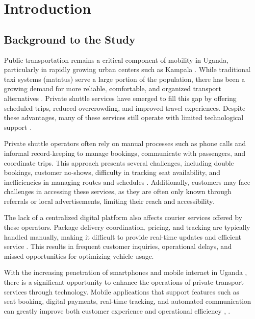 \chapter{Introduction}
\label{chap:introduction}

\section{Background to the Study}
Public transportation remains a critical component of mobility in Uganda,
particularly in rapidly growing urban centers such as Kampala
\cite{mak2026kampala}. While traditional taxi systems (matatus) serve a large
portion of the population, there has been a growing demand for more reliable,
comfortable, and organized transport alternatives \cite{rugamba2020lowcarbon}.
Private shuttle services have emerged to fill this gap by offering scheduled
trips, reduced overcrowding, and improved travel experiences. Despite these
advantages, many of these services still operate with limited technological
support \cite{bmau2025transport}.


Private shuttle operators often rely on manual processes such as phone calls and
informal record-keeping to manage bookings, communicate with passengers, and
coordinate trips. This approach presents several challenges, including double
bookings, customer no-shows, difficulty in tracking seat availability, and
inefficiencies in managing routes and schedules \cite{masinde2024uganda}.
Additionally, customers may face challenges in accessing these services, as they
are often only known through referrals or local advertisements, limiting their
reach and accessibility.


The lack of a centralized digital platform also affects courier services offered
by these operators. Package delivery coordination, pricing, and tracking are
typically handled manually, making it difficult to provide real-time updates and
efficient service \cite{itd2026couriercomparison}. This results in frequent
customer inquiries, operational delays, and missed opportunities for optimizing
vehicle usage.


With the increasing penetration of smartphones and mobile internet in Uganda
\cite{ucc2024sectorreport}, there is a significant opportunity to enhance the
operations of private transport services through technology. Mobile applications
that support features such as seat booking, digital payments, real-time
tracking, and automated communication can greatly improve both customer
experience and operational efficiency \cite{vocal2026busbooking},
\cite{sayyed2024mobilecx}.


